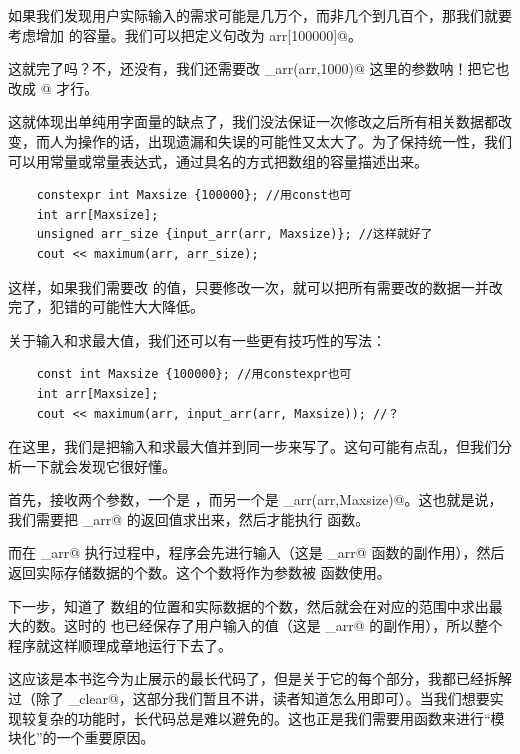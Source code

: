 如果我们发现用户实际输入的需求可能是几万个，而非几个到几百个，那我们就要考虑增加 \lstinline@arr@ 的容量。我们可以把定义句改为 \lstinline@int arr[100000]@。\par
这就完了吗？不，还没有，我们还需要改 \lstinline@input_arr(arr,1000)@ 这里的参数呐！把它也改成 @ 才行。\par
这就体现出单纯用字面量的缺点了，我们没法保证一次修改之后所有相关数据都改变，而人为操作的话，出现遗漏和失误的可能性又太大了。为了保持统一性，我们可以用常量或常量表达式，通过具名的方式把数组的容量描述出来。
\begin{lstlisting}
    constexpr int Maxsize {100000}; //用const也可
    int arr[Maxsize];
    unsigned arr_size {input_arr(arr, Maxsize)}; //这样就好了
    cout << maximum(arr, arr_size);
\end{lstlisting}
这样，如果我们需要改 \lstinline@Maxsize@ 的值，只要修改一次，就可以把所有需要改的数据一并改完了，犯错的可能性大大降低。\par
关于输入和求最大值，我们还可以有一些更有技巧性的写法：
\begin{lstlisting}
    const int Maxsize {100000}; //用constexpr也可
    int arr[Maxsize];
    cout << maximum(arr, input_arr(arr, Maxsize)); //？
\end{lstlisting}
在这里，我们是把输入和求最大值并到同一步来写了。这句可能有点乱，但我们分析一下就会发现它很好懂。\par
首先，\lstinline@maximum@ 接收两个参数，一个是 \lstinline@arr@，而另一个是 \lstinline@input_arr(arr,Maxsize)@。这也就是说，我们需要把 \lstinline@input_arr@ 的返回值求出来，然后才能执行 \lstinline@maximum@ 函数。\par
而在 \lstinline@input_arr@ 执行过程中，程序会先进行输入（这是 \lstinline@input_arr@ 函数的副作用），然后返回实际存储数据的个数。这个个数将作为参数被 \lstinline@maximum@ 函数使用。\par
下一步，\lstinline@maximum@ 知道了 \lstinline@arr@ 数组的位置和实际数据的个数，然后就会在对应的范围中求出最大的数。这时的 \lstinline@arr@ 也已经保存了用户输入的值（这是 \lstinline@input_arr@ 的副作用），所以整个程序就这样顺理成章地运行下去了。\par
\par
这应该是本书迄今为止展示的最长代码了，但是关于它的每个部分，我都已经拆解过（除了 \lstinline@input_clear@，这部分我们暂且不讲，读者知道怎么用即可）。当我们想要实现较复杂的功能时，长代码总是难以避免的。这也正是我们需要用函数来进行``模块化''的一个重要原因。\par
